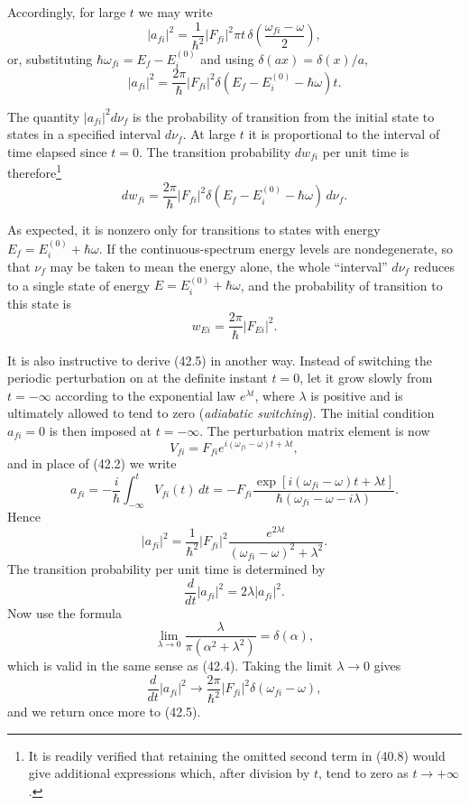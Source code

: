 Accordingly, for large $t$ we may write
\[
  |a_{fi}|^2=\frac1{\hbar^2}|F_{fi}|^2\pi t\,
  \delta\left(\frac{\omega_{fi}-\omega}{2}\right),
\]
or, substituting $\hbar\omega_{fi}=E_f-E_i^{(0)}$ and using
$\delta(ax)=\delta(x)/a$,
\[
  |a_{fi}|^2=\frac{2\pi}{\hbar}|F_{fi}|^2
  \delta(E_f-E_i^{(0)}-\hbar\omega)t.
\]

The quantity $|a_{fi}|^2d\nu_f$ is the probability of transition from the
initial state to states in a specified interval $d\nu_f$. At large $t$ it is
proportional to the interval of
time elapsed since $t=0$. The transition probability $dw_{fi}$ per unit time
is therefore\footnote{It is readily verified that retaining the omitted
second term in (40.8) would give additional expressions which, after division
by $t$, tend to zero as $t\to+\infty$.}
\begin{equation}
  dw_{fi}=\frac{2\pi}{\hbar}|F_{fi}|^2
  \delta(E_f-E_i^{(0)}-\hbar\omega)\,d\nu_f.
  \tag{42.5}
\end{equation}

As expected, it is nonzero only for transitions to states with energy
$E_f=E_i^{(0)}+\hbar\omega$. If the continuous-spectrum energy levels are
nondegenerate, so that $\nu_f$ may be taken to mean the energy alone, the
whole ``interval'' $d\nu_f$ reduces to a single state of energy
$E=E_i^{(0)}+\hbar\omega$, and the probability of transition to this state is
\begin{equation}
  w_{Ei}=\frac{2\pi}{\hbar}|F_{Ei}|^2.
  \tag{42.6}
\end{equation}

It is also instructive to derive (42.5) in another way. Instead of switching
the periodic perturbation on at the definite instant $t=0$, let it grow
slowly from $t=-\infty$ according to the exponential law $e^{\lambda t}$,
where $\lambda$ is positive and is ultimately allowed to tend to zero
(\emph{adiabatic switching}). The initial condition $a_{fi}=0$ is then imposed
at $t=-\infty$. The perturbation matrix element is now
\[
  V_{fi}=F_{fi}e^{i(\omega_{fi}-\omega)t+\lambda t},
\]
and in place of (42.2) we write
\begin{equation}
  a_{fi}=-\frac{i}{\hbar}\int_{-\infty}^{t}V_{fi}(t)\,dt
  =-F_{fi}\frac{\exp[i(\omega_{fi}-\omega)t+\lambda t]}
                  {\hbar(\omega_{fi}-\omega-i\lambda)}.
  \tag{42.7}
\end{equation}
Hence
\[
  |a_{fi}|^2=\frac1{\hbar^2}|F_{fi}|^2
  \frac{e^{2\lambda t}}{(\omega_{fi}-\omega)^2+\lambda^2}.
\]
The transition probability per unit time is determined by
\[
  \frac d{dt}|a_{fi}|^2=2\lambda|a_{fi}|^2.
\]
Now use the formula
\begin{equation}
  \lim_{\lambda\to0}\frac{\lambda}
  {\pi(\alpha^2+\lambda^2)}=\delta(\alpha),
  \tag{42.8}
\end{equation}
which is valid in the same sense as (42.4). Taking the limit
$\lambda\to0$ gives
\[
  \frac d{dt}|a_{fi}|^2\longrightarrow
  \frac{2\pi}{\hbar^2}|F_{fi}|^2\delta(\omega_{fi}-\omega),
\]
and we return once more to (42.5).
